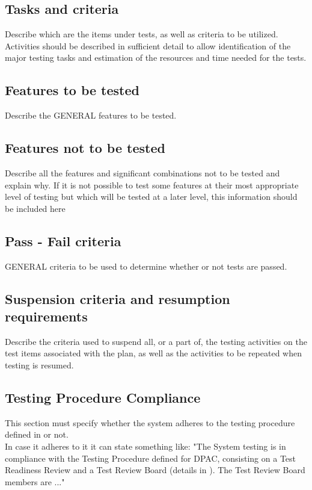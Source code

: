 \documentclass[CUx,lsstdraft,STS]{lsstdoc}
\begin{document}
\subsection{Tasks and criteria \label{sect:tasks}}
Describe which are the items under tests, as well as criteria to be utilized. Activities should be described in sufficient detail
to allow identification of the major testing tasks and estimation of the resources and time needed for the tests. 
\subsection{Features to be tested \label{sect:feat2tested}}
Describe the GENERAL features to be tested.
\subsection{Features not to be tested \label{sect:featnot2tested}}
Describe all the features and significant combinations not to be tested and explain why. If it is not possible to test some
features at their most appropriate level of testing but which will be tested at a later level, this information should be
included here
\subsection{Pass - Fail criteria \label{sect:passfail}}
GENERAL criteria to be used to determine whether or not tests are passed.
\subsection{Suspension criteria and resumption requirements \label{suspension}}
Describe the criteria used to suspend all, or a part of, the testing activities on the test items associated with
the plan, as well as the activities to be repeated when testing is resumed.
\subsection{Testing Procedure Compliance \label{sect:testprocedure}}
This section must specify whether the system adheres to the testing procedure defined in  or not.\\
In case it adheres to it it can state something like: "The System testing is in compliance with the Testing Procedure defined for DPAC, consisting on a Test Readiness
Review and a Test Review Board (details in ). The Test Review Board members are ..."
\end{document}
